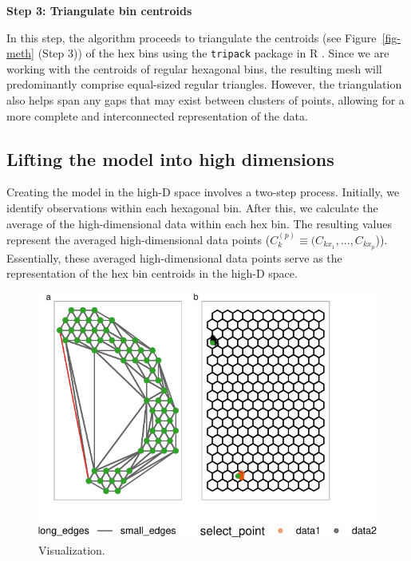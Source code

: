 \documentclass[
  12pt]{article}
\begin{document}
\textbf{Step 3: Triangulate bin centroids}

In this step, the algorithm proceeds to triangulate the centroids (see
Figure~\ref{fig-meth} (Step 3)) of the hex bins using the
\texttt{tripack} package in R \citep{article54}. Since we are working
with the centroids of regular hexagonal bins, the resulting mesh will
predominantly comprise equal-sized regular triangles. However, the
triangulation also helps span any gaps that may exist between clusters
of points, allowing for a more complete and interconnected
representation of the data.

\hypertarget{lifting-the-model-into-high-dimensions}{%
\subsection{Lifting the model into high
dimensions}\label{lifting-the-model-into-high-dimensions}}

Creating the model in the high-D space involves a two-step process.
Initially, we identify observations within each hexagonal bin. After
this, we calculate the average of the high-dimensional data within each
hex bin. The resulting values represent the averaged high-dimensional
data points (\(C_k^{(p)} \equiv (C_{kx_1}, ..., C_{kx_p}\))).
Essentially, these averaged high-dimensional data points serve as the
representation of the hex bin centroids in the high-D space.

\begin{figure}

{\centering \includegraphics{paper_files/figure-pdf/fig-wkhighD-1.pdf}

}

\caption{\label{fig-wkhighD}Visualization.}

\end{figure}
\end{document}

